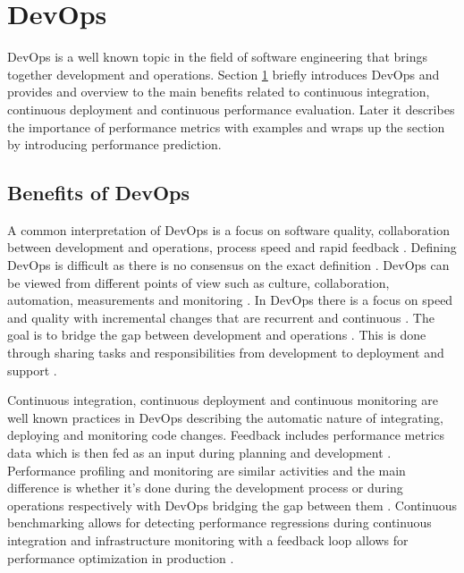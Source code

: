 \section{DevOps} %
\label{sec:devops}

DevOps is a well known topic in the field of software engineering that brings together development and operations. Section \ref{sec:devops} briefly introduces DevOps and provides and overview to the main benefits related to continuous integration, continuous deployment and continuous performance evaluation. Later it describes the importance of performance metrics with examples and wraps up the section by introducing performance prediction.

\subsection{Benefits of DevOps}

A common interpretation of DevOps is a focus on software quality, collaboration between development and operations, process speed and rapid feedback \parencite{mishraDevOpsSoftwareQuality2020,wallerIncludingPerformanceBenchmarks2015, pereraImproveSoftwareQuality2017}. Defining DevOps is difficult as there is no consensus on the exact definition \parencite{smedsDevOpsDefinitionPerceived2015,mishraDevOpsSoftwareQuality2020}. DevOps can be viewed from different points of view such as culture, collaboration, automation, measurements and monitoring \parencite{mishraDevOpsSoftwareQuality2020, wallerIncludingPerformanceBenchmarks2015}. In DevOps there is a focus on speed and quality with incremental changes that are recurrent and continuous \parencite{mishraDevOpsSoftwareQuality2020}. The goal is to bridge the gap between development and operations \parencite{smedsDevOpsDefinitionPerceived2015}. This is done through sharing tasks and responsibilities from development to deployment and support \parencite{mishraDevOpsSoftwareQuality2020}.

Continuous integration, continuous deployment and continuous monitoring are well known practices in DevOps \parencite{wallerIncludingPerformanceBenchmarks2015} describing the automatic nature of integrating, deploying and monitoring code changes. Feedback includes performance metrics data which is then fed as an input during planning and development \parencite{smedsDevOpsDefinitionPerceived2015}. Performance profiling and monitoring are similar activities and the main difference is whether it's done during the development process or during operations respectively \parencite{wallerIncludingPerformanceBenchmarks2015} with DevOps bridging the gap between them \parencite{brunnertPerformanceorientedDevOpsResearch2015}. Continuous benchmarking allows for detecting performance regressions during continuous integration \parencite{wallerIncludingPerformanceBenchmarks2015} and infrastructure monitoring with a feedback loop allows for performance optimization in production \parencite{smedsDevOpsDefinitionPerceived2015}.

